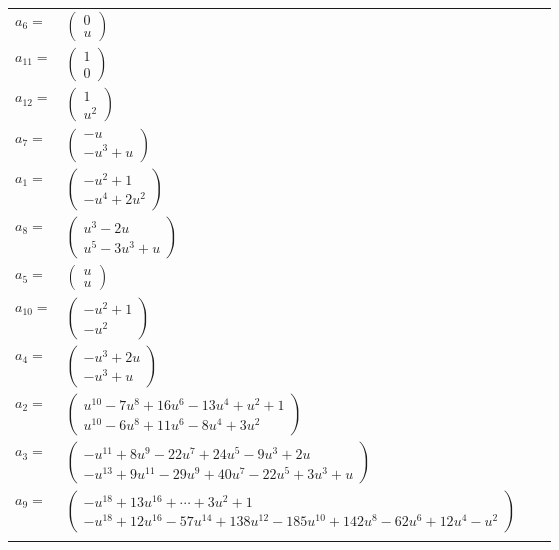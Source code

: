 \documentclass[1p]{elsarticle_modified}
\theoremstyle{definition}
\begin{document}
\begin{tabular}{m{7pt} m{180pt} m{7pt} m{180pt} }
\flushright $a_{6}=$&$\begin{pmatrix}0\\u\end{pmatrix}$ \\
\flushright $a_{11}=$&$\begin{pmatrix}1\\0\end{pmatrix}$ \\
\flushright $a_{12}=$&$\begin{pmatrix}1\\u^2\end{pmatrix}$ \\
\flushright $a_{7}=$&$\begin{pmatrix}- u\\- u^3+u\end{pmatrix}$ \\
\flushright $a_{1}=$&$\begin{pmatrix}- u^2+1\\- u^4+2 u^2\end{pmatrix}$ \\
\flushright $a_{8}=$&$\begin{pmatrix}u^3-2 u\\u^5-3 u^3+u\end{pmatrix}$ \\
\flushright $a_{5}=$&$\begin{pmatrix}u\\u\end{pmatrix}$ \\
\flushright $a_{10}=$&$\begin{pmatrix}- u^2+1\\- u^2\end{pmatrix}$ \\
\flushright $a_{4}=$&$\begin{pmatrix}- u^3+2 u\\- u^3+u\end{pmatrix}$ \\
\flushright $a_{2}=$&$\begin{pmatrix}u^{10}-7 u^8+16 u^6-13 u^4+u^2+1\\u^{10}-6 u^8+11 u^6-8 u^4+3 u^2\end{pmatrix}$ \\
\flushright $a_{3}=$&$\begin{pmatrix}- u^{11}+8 u^9-22 u^7+24 u^5-9 u^3+2 u\\- u^{13}+9 u^{11}-29 u^9+40 u^7-22 u^5+3 u^3+u\end{pmatrix}$ \\
\flushright $a_{9}=$&$\begin{pmatrix}- u^{18}+13 u^{16}+\cdots+3 u^2+1\\- u^{18}+12 u^{16}-57 u^{14}+138 u^{12}-185 u^{10}+142 u^8-62 u^6+12 u^4- u^2\end{pmatrix}$\\&\end{tabular}
\end{document}

